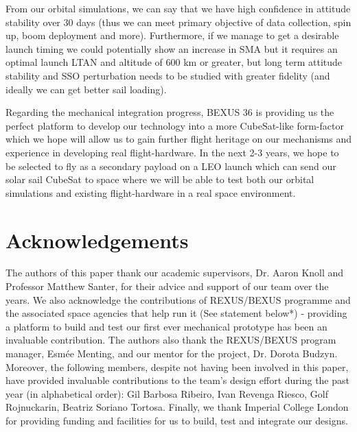 \documentclass[final,3p,times,twocolumn]{elsarticle}
\begin{document}
\vspace{5pt}
\par\noindent From our orbital simulations, we can say that we have high confidence in attitude stability over 30 days (thus we can meet primary objective of data collection, spin up, boom deployment and more). Furthermore, if we manage to get a desirable launch timing we could potentially show an increase in SMA  but it requires an optimal launch LTAN and altitude of 600 km or greater, but long term attitude stability and SSO perturbation needs to be studied with greater fidelity (and ideally we can get better sail loading).

\vspace{5pt}
\par\noindent Regarding the mechanical integration progress, BEXUS 36 is providing us the perfect platform to develop our technology into a more CubeSat-like form-factor which we hope will allow us to gain further flight heritage on our mechanisms and experience in developing real flight-hardware. In the next 2-3 years, we hope to be selected to fly as a secondary payload on a LEO launch which can send our solar sail CubeSat to space where we will be able to test both our orbital simulations and existing flight-hardware in a real space environment.

\section*{Acknowledgements}
\noindent The authors of this paper thank our academic supervisors, Dr. Aaron Knoll and Professor Matthew Santer, for their advice and support of our team over the years. We also acknowledge the contributions of REXUS/BEXUS programme and the associated space agencies that help run it (See statement below*) - providing a platform to build and test our first ever mechanical prototype has been an invaluable contribution. The authors also thank the REXUS/BEXUS program manager, Esmée Menting, and our mentor for the project, Dr. Dorota Budzyn. Moreover, the following members, despite not having been involved in this paper, have provided invaluable contributions to the team’s design effort during the past year (in alphabetical order): Gil Barbosa Ribeiro, Ivan Revenga Riesco, Golf Rojnuckarin, Beatriz Soriano Tortosa. Finally, we thank Imperial College London for providing funding and facilities for us to build, test and integrate our designs.
\end{document}
